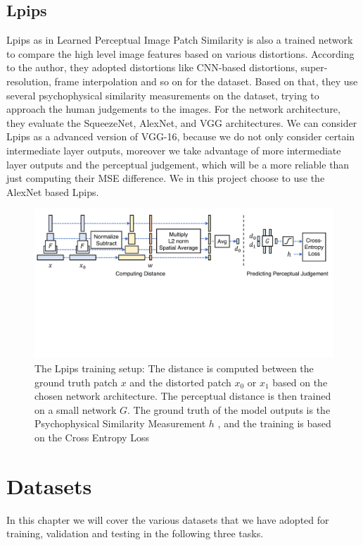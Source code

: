 \documentclass[a4paper,12pt,twoside]{report}
\begin{document}
\section{Lpips}
Lpips as in Learned Perceptual Image Patch Similarity\cite{zhang2018perceptual} is also a trained network to compare the high level image features based on various distortions. According to the author, they adopted distortions like CNN-based distortions, super-resolution, frame interpolation and so on for the dataset. Based on that, they use several psychophysical similarity measurements on the dataset, trying to approach the human judgements to the images. For the network architecture, they evaluate the SqueezeNet, AlexNet, and VGG architectures. We can consider Lpips as a advanced version of VGG-16, because we do not only consider certain intermediate layer outputs, moreover we take advantage of more intermediate layer outputs and the perceptual judgement, which will be a more reliable than just computing their MSE difference. We in this project choose to use the AlexNet based Lpips.
\begin{figure}
\centering
\includegraphics[width=1.0\textwidth]{network_lpips.pdf}
\caption{The Lpips training setup: The distance is computed between the ground truth patch $x$ and the distorted patch $x_0$ or $x_1$ based on the chosen network architecture. The perceptual distance is then trained on a small network $G$. The ground truth of the model outputs is the Psychophysical Similarity Measurement $h$ , and the training is based on the Cross Entropy Loss\cite{zhang2018perceptual}}
\end{figure}







\chapter{Datasets}
In this chapter we will cover the various datasets that we have adopted for training, validation and testing in the following three tasks.
\end{document}
